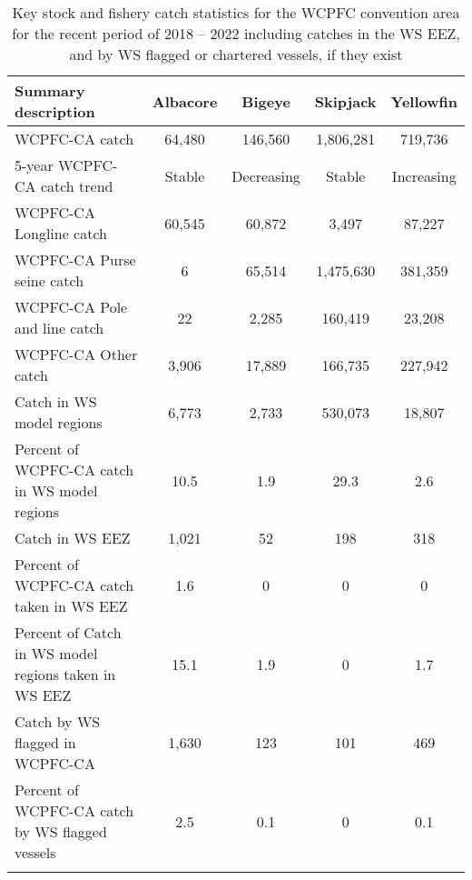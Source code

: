 \begin{longtable}{lcccc}
\caption{Key stock and fishery catch statistics for the WCPFC convention area for the recent period of 2018 -- 2022 including catches in the WS EEZ, and by WS flagged or chartered vessels, if they exist} \\ 
  \hline
Summary description & Albacore & Bigeye & Skipjack & Yellowfin \\ 
  \hline
WCPFC-CA catch & 64,480 & 146,560 & 1,806,281 & 719,736 \\ 
  5-year WCPFC-CA catch trend & Stable & Decreasing & Stable & Increasing \\ 
  WCPFC-CA Longline catch & 60,545 & 60,872 & 3,497 & 87,227 \\ 
  WCPFC-CA Purse seine catch & 6 & 65,514 & 1,475,630 & 381,359 \\ 
  WCPFC-CA Pole and line catch & 22 & 2,285 & 160,419 & 23,208 \\ 
  WCPFC-CA Other catch & 3,906 & 17,889 & 166,735 & 227,942 \\ 
  Catch in WS model regions & 6,773 & 2,733 & 530,073 & 18,807 \\ 
  Percent of WCPFC-CA catch in WS model regions & 10.5 & 1.9 & 29.3 & 2.6 \\ 
   \hline
Catch in WS EEZ & 1,021 & 52 & 198 & 318 \\ 
  Percent of WCPFC-CA catch taken in WS EEZ & 1.6 & 0 & 0 & 0 \\ 
  Percent of Catch in WS model regions taken in WS EEZ & 15.1 & 1.9 & 0 & 1.7 \\ 
  Catch by WS flagged in WCPFC-CA & 1,630 & 123 & 101 & 469 \\ 
  Percent of WCPFC-CA catch by WS flagged vessels & 2.5 & 0.1 & 0 & 0.1 \\ 
  \hline
\label{cat_sum_tab}
\end{longtable}
